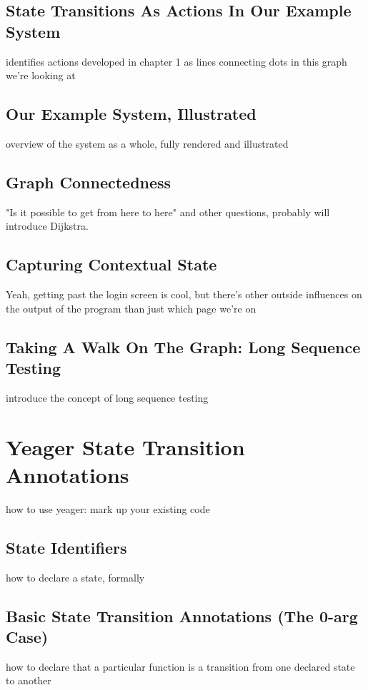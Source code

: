 \subsection{State Transitions As Actions In Our Example System}
identifies actions developed in chapter 1 as lines connecting dots in this graph we're looking at

\subsection{Our Example System, Illustrated}
overview of the system as a whole, fully rendered and illustrated

\subsection{Graph Connectedness}
"Is it possible to get from here to here" and other questions, probably will introduce Dijkstra.

\subsection{Capturing Contextual State}
Yeah, getting past the login screen is cool, but there's other outside influences on the output of the program than just which page we're on

\subsection{Taking A Walk On The Graph: Long Sequence Testing}
introduce the concept of long sequence testing

\section{Yeager State Transition Annotations}
how to use yeager: mark up your existing code

\subsection{State Identifiers}
how to declare a state, formally

\subsection{Basic State Transition Annotations (The 0-arg Case)}
how to declare that a particular function is a transition from one declared state to another

